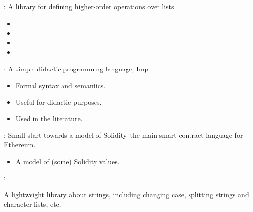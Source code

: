 \begin{frame}

\newlibtitle

:
A library for defining higher-order operations over lists
\begin{itemize}
\item {}
\item {}
\item {}
\item {}
\end{itemize}
\end{frame}


\begin{frame}

\newlibtitle

:
A simple didactic programming language, Imp.
\begin{itemize}
\item Formal syntax and semantics.
\item Useful for didactic purposes.
\item Used in the literature.
\end{itemize}

\end{frame}


\begin{frame}

\newlibtitle

:
Small start towards a model of Solidity,
the main smart contract language for Ethereum.
\begin{itemize}
\item A model of (some) Solidity values.
\end{itemize}

\end{frame}


\begin{frame}

\newlibtitle

:

A lightweight library about strings, including changing case,
splitting strings and character lists, etc.

\end{frame}

